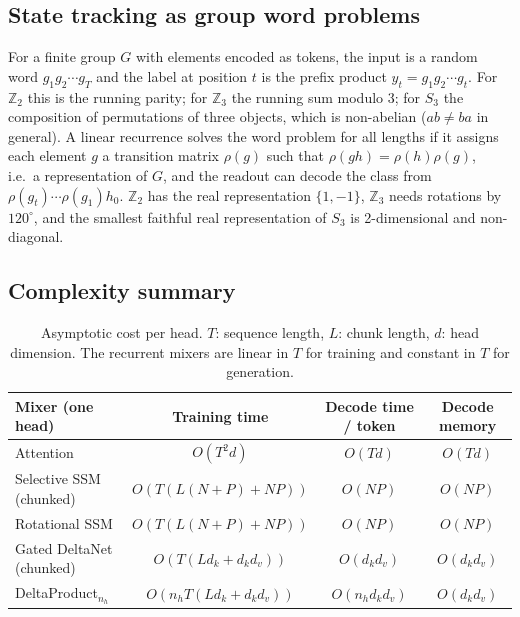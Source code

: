 \subsection{State tracking as group word problems}
For a finite group $G$ with elements encoded as tokens, the input is a random word $g_1g_2\cdots g_T$ and the
label at position $t$ is the prefix product $y_t=g_1g_2\cdots g_t$. For $\mathbb{Z}_2$ this is the running
parity; for $\mathbb{Z}_3$ the running sum modulo 3; for $S_3$ the composition of permutations of three
objects, which is non-abelian ($ab\ne ba$ in general). A linear recurrence solves the word problem for all
lengths if it assigns each element $g$ a transition matrix $\rho(g)$ such that $\rho(gh)=\rho(h)\rho(g)$,
i.e.\ a representation of $G$, and the readout can decode the class from $\rho(g_t)\cdots\rho(g_1)h_0$.
$\mathbb{Z}_2$ has the real representation $\{1,-1\}$, $\mathbb{Z}_3$ needs rotations by $120^\circ$, and the
smallest faithful real representation of $S_3$ is 2-dimensional and non-diagonal.

\subsection{Complexity summary}
\begin{table}[htbp]\centering\small
\begin{tabular}{lccc}\toprule
Mixer (one head) & Training time & Decode time / token & Decode memory \\\midrule
Attention & $O(T^2 d)$ & $O(T d)$ & $O(T d)$ \\
Selective SSM (chunked) & $O(T(L(N+P)+NP))$ & $O(NP)$ & $O(NP)$ \\
Rotational SSM & $O(T(L(N+P)+NP))$ & $O(NP)$ & $O(NP)$ \\
Gated DeltaNet (chunked) & $O(T(Ld_k + d_kd_v))$ & $O(d_kd_v)$ & $O(d_kd_v)$ \\
DeltaProduct$_{n_h}$ & $O(n_h T(Ld_k + d_kd_v))$ & $O(n_h d_kd_v)$ & $O(d_kd_v)$ \\\bottomrule
\end{tabular}
\caption{Asymptotic cost per head. $T$: sequence length, $L$: chunk length, $d$: head dimension. The recurrent
mixers are linear in $T$ for training and constant in $T$ for generation.}
\label{tab:complexity}
\end{table}
